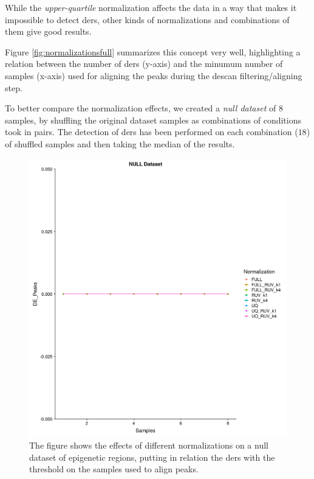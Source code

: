While the \textit{upper-quartile} normalization affects the data in a way that makes it impossible to detect \glspl{der}, other kinds of normalizations and combinations of them give good results.

Figure \ref{fig:normalizationsfull} summarizes this concept very well, highlighting a relation between the number of \glspl{der} (y-axis) and the minumum number of samples (x-axis) used for aligning the peaks during the \gls{descan} filtering/aligning step.

To better compare the normalization effects, we created a \textit{null dataset} of 8 samples, by shuffling the original dataset samples as combinations of conditions took in pairs.
The detection of \glspl{der} has been performed on each combination ($18$) of shuffled samples and then taking the median of the results.

\begin{figure}[H]
\centering
\includegraphics[width=\textwidth, keepaspectratio]{img/descan2/null_dataset_final.pdf}
\caption[Normalizations applied to null dataset]{The figure shows the effects of different normalizations on a null dataset of epigenetic regions, putting in relation the \glspl{der} with the threshold on the samples used to align peaks.}
\label{fig:normalizationsnull}
\centering
\end{figure}

